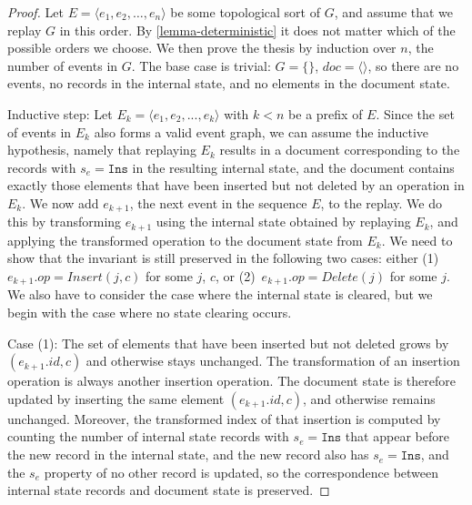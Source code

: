 \documentclass[sigplan,10pt]{acmart}
\begin{document}
\begin{proof}
  Let $E = \langle e_1, e_2, \dots, e_n \rangle$ be some topological sort of $G$, and assume that we replay $G$ in this order.
  By \autoref{lemma-deterministic} it does not matter which of the possible orders we choose.
  We then prove the thesis by induction over $n$, the number of events in $G$.
  The base case is trivial: $G=\{\}$, $\mathit{doc}=\langle \rangle$, so there are no events, no records in the internal state, and no elements in the document state.

  Inductive step: Let $E_k = \langle e_1, e_2, ..., e_k \rangle$ with $k<n$ be a prefix of $E$.
  Since the set of events in $E_k$ also forms a valid event graph, we can assume the inductive hypothesis, namely that replaying $E_k$ results in a document corresponding to the records with $s_e = \texttt{Ins}$ in the resulting internal state, and the document contains exactly those elements that have been inserted but not deleted by an operation in $E_k$.
  We now add $e_{k+1}$, the next event in the sequence $E$, to the replay.
  We do this by transforming $e_{k+1}$ using the internal state obtained by replaying $E_k$, and applying the transformed operation to the document state from $E_k$.
  We need to show that the invariant is still preserved in the following two cases: either (1)~$e_{k+1}.\mathit{op} = \mathit{Insert}(j,c)$ for some $j$, $c$, or (2)~$e_{k+1}.\mathit{op} = \mathit{Delete}(j)$ for some $j$.
  We also have to consider the case where the internal state is cleared, but we begin with the case where no state clearing occurs.

  Case (1): The set of elements that have been inserted but not deleted grows by $(e_{k+1}.\mathit{id}, c)$ and otherwise stays unchanged.
  The transformation of an insertion operation is always another insertion operation.
  The document state is therefore updated by inserting the same element $(e_{k+1}.\mathit{id}, c)$, and otherwise remains unchanged.
  Moreover, the transformed index of that insertion is computed by counting the number of internal state records with $s_e = \texttt{Ins}$ that appear before the new record in the internal state, and the new record also has $s_e = \texttt{Ins}$, and the $s_e$ property of no other record is updated, so the correspondence between internal state records and document state is preserved.


\end{proof}
\end{document}
